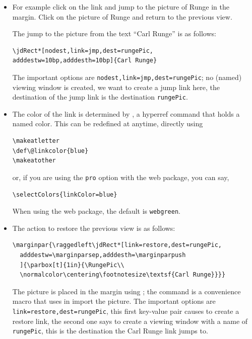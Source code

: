 \documentclass{article}
\begin{document}
\begin{itemize}
\item[] For example click on the link
\textbf{}%
 and jump to
the picture of Runge in the margin. Click on the picture of Runge and
return to the previous view.

The jump to the picture from the text ``Carl Runge'' is as follows:
\begin{Verbatim}[xleftmargin=\amtIndent]
\jdRect*[nodest,link=jmp,dest=rungePic,
adddestw=10bp,adddesth=10bp]{Carl Runge}
\end{Verbatim}
The important options are \texttt{nodest,link=jmp,dest=rungePic};
no (named) viewing window is created, we want to create a jump link here,
the destination of the jump link is the destination \texttt{rungePic}.

\item[] The color of the link is determined by , a \textsf{hyperref}
command that holds a named color. This can be redefined at anytime,
directly using
\begin{Verbatim}[xleftmargin=\amtIndent]
\makeatletter
\def\@linkcolor{blue}
\makeatother
\end{Verbatim}
or, if you are using the \texttt{pro} option with the \textsf{web}
package, you can say,
\begin{Verbatim}[xleftmargin=\amtIndent]
\selectColors{linkColor=blue}
\end{Verbatim}
When using the \textsf{web} package, the default is \texttt{webgreen}.

\item[] The action to restore the previous view is as follows:
\begin{Verbatim}[xleftmargin=\amtIndent]
\marginpar{\raggedleft\jdRect*[link=restore,dest=rungePic,
  adddestw=\marginparsep,adddesth=\marginparpush
  ]{\parbox[t]{1in}{\RungePic\\
  \normalcolor\centering\footnotesize\textsf{Carl Runge}}}}
\end{Verbatim}
The picture is placed in the margin using ; the command
 is a convenience macro that uses  in
import the picture. The important options are
\texttt{link=restore,dest=rungePic}, this first key-value pair causes
 to create a restore link, the second one says to create a
viewing window with a name of \texttt{rungePic}, this is the
destination the Carl Runge link jumps to.



\end{itemize}
\end{document}
